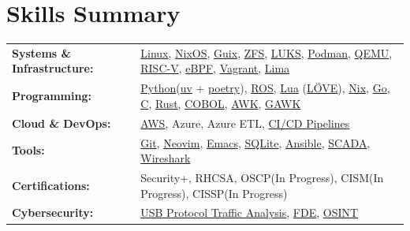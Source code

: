 \documentclass[a4paper,11pt]{article}
\begin{document}
\section{Skills Summary}
    \vspace{1pt}
	{\small
	\begin{tabularx}{\textwidth}{@{}l@{\hspace{1em}}X@{}}
	\textbf{Systems \& Infrastructure:} & \href{https://github.com/torvalds/linux}{Linux}, \href{https://nixos.org/manual/nixos/stable/}{NixOS}, \href{https://guix.gnu.org/}{Guix}, \href{https://openzfs.org/wiki/Main_Page}{ZFS}, \href{https://gitlab.com/cryptsetup/cryptsetup}{LUKS}, \href{https://podman.io/docs}{Podman}, \href{https://www.qemu.org/}{QEMU}, \href{https://riscv.org/}{RISC-V}, \href{https://ebpf.io/}{eBPF}, \href{https://developer.hashicorp.com/vagrant}{Vagrant}, \href{https://github.com/lima-vm/lima}{Lima} \\[2pt]
	\textbf{Programming:}               & \href{https://www.youtube.com/watch?v=ZmInkxbvlCs}{Python}(\href{https://docs.astral.sh/uv/}{uv} + \href{https://python-poetry.org/docs/}{poetry}), \href{https://en.wikipedia.org/wiki/Robot_Operating_System}{ROS}, \href{https://www.lua.org/}{Lua} (\href{https://love2d.org/}{LÖVE}), \href{https://nixos.org/}{Nix}, \href{https://go.dev/}{Go}, \href{https://gustedt.gitlabpages.inria.fr/modern-c/}{C}, \href{https://rust-lang.org/}{Rust}, \href{https://gnucobol.sourceforge.io/doc/gnucobol.pdf}{COBOL}, \href{http://tuxgraphics.org/~guido/scripts/awk-one-liner.html}{AWK}, \href{https://www.gnu.org/software/gawk/manual/gawk.html}{GAWK} \\[2pt]
	\textbf{Cloud \& DevOps:}           & \href{https://docs.aws.amazon.com/}{AWS}, Azure, Azure ETL, \href{https://about.gitlab.com/topics/ci-cd/cicd-pipeline/}{CI/CD Pipelines} \\[2pt]
	\textbf{Tools:}                     & \href{https://git-scm.com/docs}{Git}, \href{https://neovim.io/doc/user/}{Neovim}, \href{https://www.gnu.org/software/emacs/manual/}{Emacs}, \href{https://www.sqlite.org/docs.html}{SQLite}, \href{https://docs.ansible.com/projects/ansible/latest/index.html}{Ansible}, \href{https://en.wikipedia.org/wiki/SCADA}{SCADA}, \href{https://www.wireshark.org/download.html}{Wireshark} \\[2pt]
	\textbf{Certifications:}            & Security+, RHCSA, OSCP(In Progress), CISM(In Progress), CISSP(In Progress)  \\[2pt]
	\textbf{Cybersecurity:}             & \href{https://morphykuffour.github.io/linux/tshark/hacking/2025/02/20/TShark-Keylogger.html}{USB Protocol Traffic Analysis}, \href{https://security.berkeley.edu/education-awareness/enabling-full-disk-encryption}{FDE}, \href{https://github.com/frangelbarrera/OSINT-BIBLE}{OSINT} \\[2pt]

\end{tabularx}}
\end{document}
